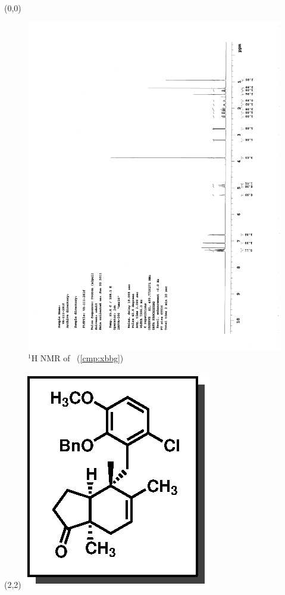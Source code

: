 \begin{textblock}{20}(0,0)
\begin{figure}[htb]
\caption{$^1$H NMR of \CMPxbbg\ (\ref{cmp:xbbg})}
\includegraphics[scale=0.75, trim = 0mm 0mm 0mm 5mm,
clip]{chp_singlecarbon/images/nmr/xbbgH}
\vspace{-100pt}
\end{figure}
\end{textblock}
\begin{textblock}{1}(2,2)
\includegraphics[scale=0.8, angle=90]{chp_singlecarbon/images/xbbg}
\end{textblock}
